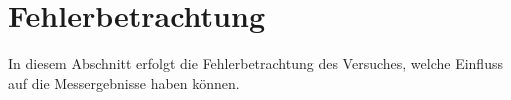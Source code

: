 \chapter{Fehlerbetrachtung}
\label{sec:fehler}
In diesem Abschnitt erfolgt die Fehlerbetrachtung des Versuches, welche Einfluss auf die Messergebnisse haben können.\\

